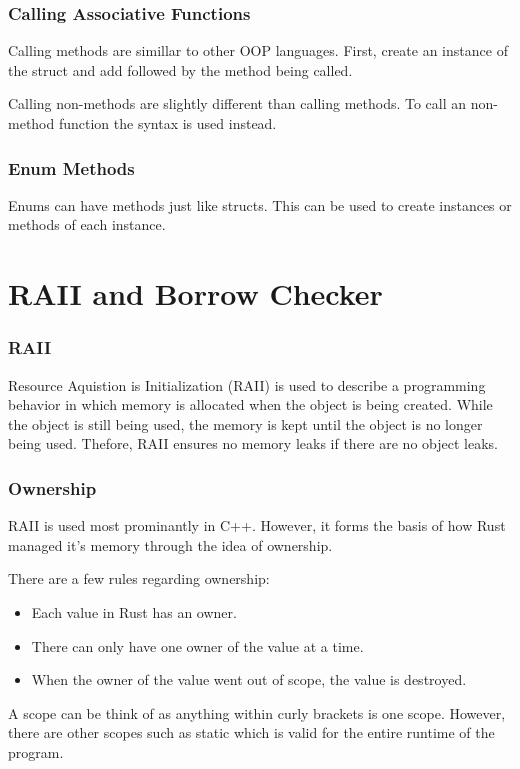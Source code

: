 \documentclass{beamer}
\begin{document}
\begin{frame}[allowframebreaks]
  \frametitle{Calling Associative Functions}
  Calling methods are simillar to other OOP languages. First, create an instance of the struct and add  followed by the method being called.
  

  \pagebreak

  Calling non-methods are slightly different than calling methods. To call an non-method function the \inlinecode{::} syntax is used instead.
  
\end{frame}

\begin{frame}[fragile]
  \frametitle{Enum Methods}
  Enums can have methods just like structs. This can be used to create instances or methods of each instance.

  
\end{frame}

\section{RAII and Borrow Checker}
\begin{frame}
  \frametitle{RAII}
  Resource Aquistion is Initialization (RAII) is used to describe a programming behavior in which memory is allocated when the object is being created. While the object is still being used, the memory is kept until the object is no longer being used. Thefore, RAII ensures no memory leaks if there are no object leaks.
\end{frame}

\begin{frame}
  \frametitle{Ownership}
  RAII is used most prominantly in C++. However, it forms the basis of how Rust managed it's memory through the idea of ownership.

  There are a few rules regarding ownership:
  \begin{itemize}
    \item Each value in Rust has an owner.
    \item There can only have \alert{one} owner of the value at a time.
    \item When the owner of the value went out of scope, the value is destroyed.
  \end{itemize}

  A scope can be think of as anything within curly brackets is one scope. However, there are other scopes such as static which is valid for the entire runtime of the program.
\end{frame}
\end{document}
